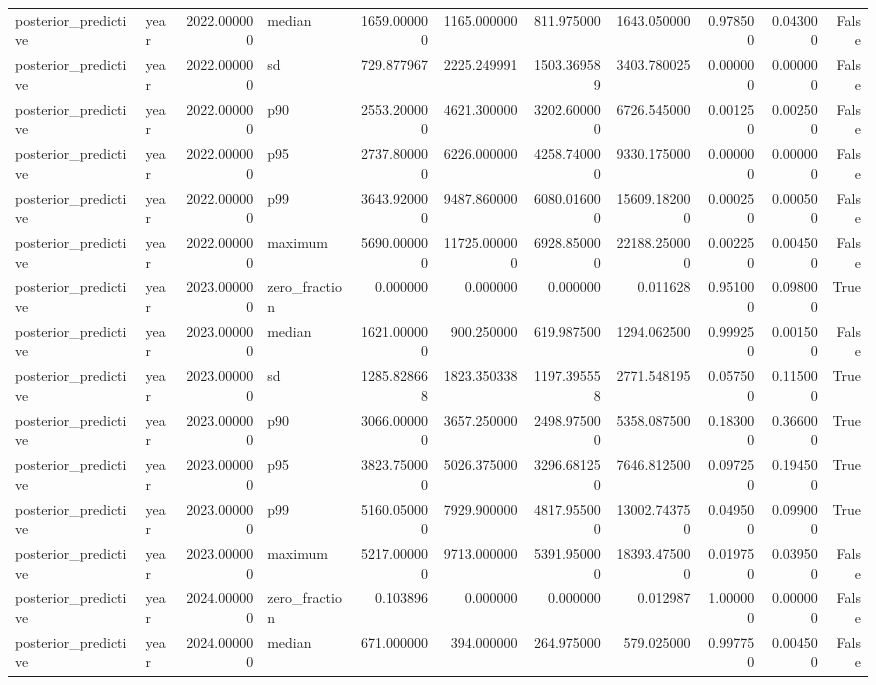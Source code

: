 \begin{tabular}{llrlrrrrrrr}
posterior\_predictive & year & 2022.000000 & median & 1659.000000 & 1165.000000 & 811.975000 & 1643.050000 & 0.978500 & 0.043000 & False \\
posterior\_predictive & year & 2022.000000 & sd & 729.877967 & 2225.249991 & 1503.369589 & 3403.780025 & 0.000000 & 0.000000 & False \\
posterior\_predictive & year & 2022.000000 & p90 & 2553.200000 & 4621.300000 & 3202.600000 & 6726.545000 & 0.001250 & 0.002500 & False \\
posterior\_predictive & year & 2022.000000 & p95 & 2737.800000 & 6226.000000 & 4258.740000 & 9330.175000 & 0.000000 & 0.000000 & False \\
posterior\_predictive & year & 2022.000000 & p99 & 3643.920000 & 9487.860000 & 6080.016000 & 15609.182000 & 0.000250 & 0.000500 & False \\
posterior\_predictive & year & 2022.000000 & maximum & 5690.000000 & 11725.000000 & 6928.850000 & 22188.250000 & 0.002250 & 0.004500 & False \\
posterior\_predictive & year & 2023.000000 & zero\_fraction & 0.000000 & 0.000000 & 0.000000 & 0.011628 & 0.951000 & 0.098000 & True \\
posterior\_predictive & year & 2023.000000 & median & 1621.000000 & 900.250000 & 619.987500 & 1294.062500 & 0.999250 & 0.001500 & False \\
posterior\_predictive & year & 2023.000000 & sd & 1285.828668 & 1823.350338 & 1197.395558 & 2771.548195 & 0.057500 & 0.115000 & True \\
posterior\_predictive & year & 2023.000000 & p90 & 3066.000000 & 3657.250000 & 2498.975000 & 5358.087500 & 0.183000 & 0.366000 & True \\
posterior\_predictive & year & 2023.000000 & p95 & 3823.750000 & 5026.375000 & 3296.681250 & 7646.812500 & 0.097250 & 0.194500 & True \\
posterior\_predictive & year & 2023.000000 & p99 & 5160.050000 & 7929.900000 & 4817.955000 & 13002.743750 & 0.049500 & 0.099000 & True \\
posterior\_predictive & year & 2023.000000 & maximum & 5217.000000 & 9713.000000 & 5391.950000 & 18393.475000 & 0.019750 & 0.039500 & False \\
posterior\_predictive & year & 2024.000000 & zero\_fraction & 0.103896 & 0.000000 & 0.000000 & 0.012987 & 1.000000 & 0.000000 & False \\
posterior\_predictive & year & 2024.000000 & median & 671.000000 & 394.000000 & 264.975000 & 579.025000 & 0.997750 & 0.004500 & False \\

\end{tabular}
